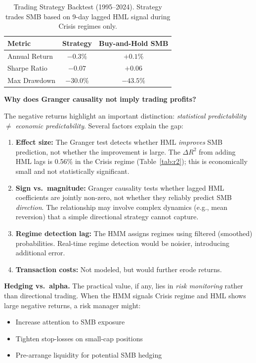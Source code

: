 \documentclass{uai2026}
\begin{document}
\begin{table}[t]
\centering
\caption{Trading Strategy Backtest (1995--2024). Strategy trades SMB based on
9-day lagged HML signal during Crisis regimes only.}
\label{tab:trading}
\begin{tabular}{lcc}
\toprule
Metric & Strategy & Buy-and-Hold SMB \\
\midrule
Annual Return & $-0.3\%$ & $+0.1\%$ \\
Sharpe Ratio & $-0.07$ & $+0.06$ \\
Max Drawdown & $-30.0\%$ & $-43.5\%$ \\
\bottomrule
\end{tabular}
\end{table}

\textbf{Why does Granger causality not imply trading profits?}

The negative returns highlight an important distinction: \emph{statistical predictability}
$\neq$ \emph{economic predictability}. Several factors explain the gap:

\begin{enumerate}
    \item \textbf{Effect size:} The Granger test detects whether HML \emph{improves}
    SMB prediction, not whether the improvement is large. The $\Delta R^2$ from
    adding HML lags is 0.56\% in the Crisis regime (Table~\ref{tab:r2}); this is
    economically small and not statistically significant.

    \item \textbf{Sign vs.\ magnitude:} Granger causality tests whether lagged HML
    coefficients are jointly non-zero, not whether they reliably predict SMB \emph{direction}.
    The relationship may involve complex dynamics (e.g., mean reversion) that a simple
    directional strategy cannot capture.

    \item \textbf{Regime detection lag:} The HMM assigns regimes using filtered
    (smoothed) probabilities. Real-time regime detection would be noisier, introducing
    additional error.

    \item \textbf{Transaction costs:} Not modeled, but would further erode returns.
\end{enumerate}

\textbf{Hedging vs.\ alpha.} The practical value, if any, lies in \emph{risk monitoring}
rather than directional trading. When the HMM signals Crisis regime and HML shows
large negative returns, a risk manager might:
\begin{itemize}
    \item Increase attention to SMB exposure
    \item Tighten stop-losses on small-cap positions
    \item Pre-arrange liquidity for potential SMB hedging
\end{itemize}
\end{document}
